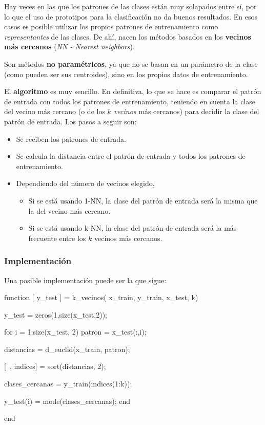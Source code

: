 \documentclass[11pt]{scrartcl}
\begin{document}
Hay veces en las que los patrones de las clases están muy solapados entre sí,
por lo que el uso de prototipos para la clasificación no da buenos
resultados. En esos casos es posible utilizar los propios patrones de
entrenamiento como \textit{representantes} de las clases. De ahí, nacen los
métodos basados en los \textbf{vecinos más cercanos} (\textit{NN - Nearest
  neighbors}).

Son métodos \textbf{no paramétricos}, ya que no se basan en un parámetro de la
clase (como pueden ser sus centroides), sino en los propios datos de
entrenamiento.

El \textbf{algoritmo} es muy sencillo. En definitiva, lo que se hace es comparar
el patrón de entrada con todos los patrones de entrenamiento, teniendo en cuenta
la clase del vecino más cercano (o de los \textit{$k$ vecinos} más cercanos)
para decidir la clase del patrón de entrada. Los pasos a seguir son:

\begin{itemize}
\item Se reciben los patrones de entrada.
\item Se calcula la distancia entre el patrón de entrada y todos los patrones de
  entrenamiento.
\item Dependiendo del número de vecinos elegido,
  \begin{itemize}
  \item Si se está usando 1-NN, la clase del patrón de entrada será la misma que
    la del vecino más cercano.
  \item Si se está usando k-NN, la clase del patrón de entrada será la más
    frecuente entre los $k$ vecinos más cercanos.
  \end{itemize}
\end{itemize}

\subsubsection{Implementación}

Una posible implementación puede ser la que sigue:

\begin{matlabcode}
function [ y_test ] = k_vecinos( x_train, y_train, x_test, k)

y_test = zeros(1,size(x_test,2));

for i = 1:size(x_test, 2)
    patron = x_test(:,i);
    
    distancias = d_euclid(x_train, patron);
    
    [~, indices] = sort(distancias, 2);    
    
    clases_cercanas = y_train(indices(1:k));
    
    y_test(i) = mode(clases_cercanas);
end

end
\end{matlabcode}
\end{document}
